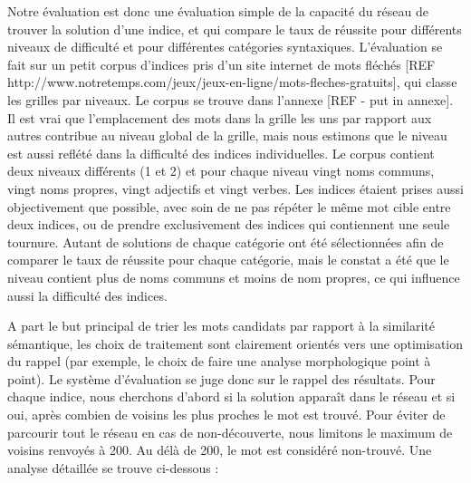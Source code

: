 Notre évaluation est donc une évaluation simple de la capacité du réseau de trouver la solution d'une indice, et qui compare le taux de réussite pour différents niveaux de difficulté et pour différentes catégories syntaxiques. L'évaluation se fait sur un petit corpus d'indices pris d'un site internet de mots fléchés [REF http://www.notretemps.com/jeux/jeux-en-ligne/mots-fleches-gratuits], qui classe les grilles par niveaux. Le corpus se trouve dans l'annexe [REF - put in annexe]. Il est vrai que l'emplacement des mots dans la grille les uns par rapport aux autres contribue au niveau global de la grille, mais nous estimons que le niveau est aussi reflété dans la difficulté des indices individuelles. Le corpus contient deux niveaux différents (1 et 2) et pour chaque niveau vingt noms communs, vingt noms propres, vingt adjectifs et vingt verbes. Les indices étaient prises aussi objectivement que possible, avec soin de ne pas répéter le même mot cible entre deux indices, ou de prendre exclusivement des indices qui contiennent une seule tournure. Autant de solutions de chaque catégorie ont été sélectionnées afin de comparer le taux de réussite pour chaque catégorie, mais le constat a été que le niveau contient plus de noms communs et moins de nom propres, ce qui influence aussi la difficulté des indices.

A part le but principal de trier les mots candidats par rapport à la similarité sémantique, les choix de traitement sont clairement orientés vers une optimisation du rappel (par exemple, le choix de faire une analyse morphologique point à point). Le système d'évaluation se juge donc sur le rappel des résultats. Pour chaque indice, nous cherchons d'abord si la solution apparaît dans le réseau et si oui, après combien de voisins les plus proches le mot est trouvé. Pour éviter de parcourir tout le réseau en cas de non-découverte, nous limitons le maximum de voisins renvoyés à 200. Au délà de 200, le mot est considéré non-trouvé. Une analyse détaillée se trouve ci-dessous :

